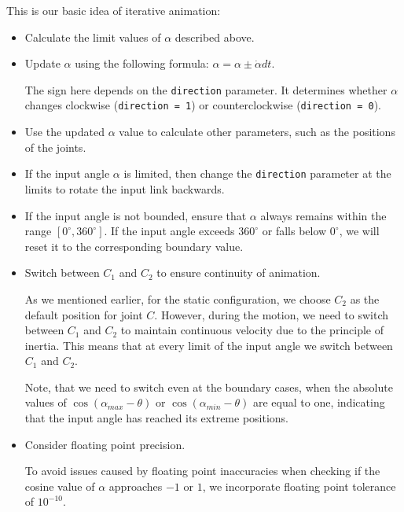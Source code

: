 \documentclass{article}
\begin{document}
This is our basic idea of iterative animation:
\begin{itemize}
	\item Calculate the limit values of $\alpha$ described above.
	
	\item Update $\alpha$ using the following formula: $\alpha = \alpha \pm \dot{\alpha} dt$.
		 
	The sign here depends on the \texttt{direction} parameter. It determines whether $\alpha$ changes clockwise (\texttt{direction = 1}) or counterclockwise (\texttt{direction = 0}).
	 
	\item Use the updated $\alpha$ value to calculate other parameters, such as the positions of the joints.
		 
	\item If the input angle $\alpha$ is limited, then change the \texttt{direction} parameter at the limits to rotate the input link backwards.
		 
	\item If the input angle is not bounded, ensure that $\alpha$ always remains within the range $[0^\circ, 360^\circ]$. If the input angle exceeds $360^\circ$ or falls below $0^\circ$, we will reset it to the corresponding boundary value.
		 
	\item Switch between $C_1$ and $C_2$ to ensure continuity of animation.
	
	As we mentioned earlier, for the static configuration, we choose $C_2$ as the default position for joint $C$. However, during the motion, we need to switch between $C_1$ and $C_2$ to maintain continuous velocity due to the principle of inertia. This means that at every limit of the input angle we switch between $C_1$ and $C_2$.
	
	Note, that we need to switch even at the boundary cases, when the absolute values of $\cos(\alpha_{max}-\theta)$ or $\cos(\alpha_{min}-\theta)$ are equal to one, indicating that the input angle has reached its extreme positions.

	\item Consider floating point precision.
	
	To avoid issues caused by floating point inaccuracies when checking if the cosine value of $\alpha$ approaches $-1$ or $1$, we incorporate floating point tolerance of $10^{-10}$.


\end{itemize}
\end{document}
